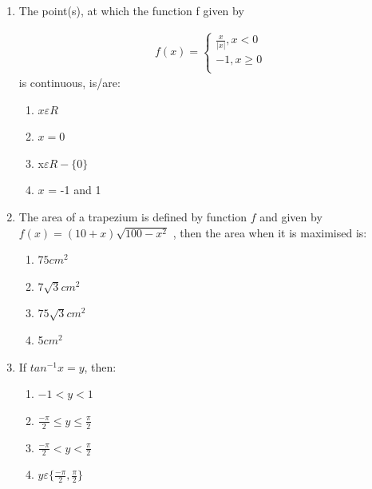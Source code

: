 \documentclass{article}
\begin{document}
\begin{enumerate}
\item The point(s), at which the function f given by  

\begin{align*}
f(x) = \begin{cases}
\frac{x}{|x|}, x < 0 \\
-1 , x \geq 0 \\
\end{cases}
\end{align*}
is continuous, is/are:
\begin{enumerate}
     \item $x\varepsilon R$ 
     \item $x = 0$
     \item x$\varepsilon R -\{0\}$ 
     \item $x$ = -1 and 1 
\end{enumerate}

\item The area of a trapezium is defined by function $f$ and given by $f(x) = (10 + x)\sqrt{100-x^2}$
, then the area when it is maximised is: 
\begin{enumerate}
    \item $75cm^2$
    \item $7\sqrt{3}cm^2$
    \item $75\sqrt{3}cm^2$
    \item 5$cm^2$
\end{enumerate}

\item If $tan^{-1} x = y$, then: 
\begin{enumerate}
    \item $-1 < y < 1$
    \item $\frac{-\pi}{2} \leq y \leq \frac{\pi}{2}$
    \item $\frac{-\pi}{2} < y < \frac{\pi}{2}$
    \item $y \varepsilon\{\frac{-\pi}{2},\frac{\pi}{2}\}$
\end{enumerate}


\end{enumerate}
\end{document}
